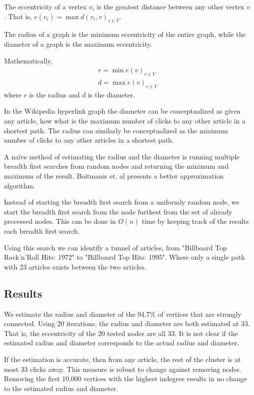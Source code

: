 \documentclass{article}
\begin{document}
The eccentricity of a vertex $v_i$ is the greatest distance between any other vertex $v$. That is, $e(v_i) = \max d(v_i, v)_{v \in V}$.

The radius of a graph is the minimum eccentricity of the entire graph, while the diameter of a graph is the maximum eccentricity.


Mathematically,
\begin{align*}
    r = \min e(v)_{v \in V} \\
    d = \max e(v)_{v \in V}
\end{align*}
where $r$ is the radius and $d$ is the diameter.

In the Wikipedia hyperlink graph the diameter can be conceptualized as given any article, how what is the maximum number of clicks to any other article in a shortest path. The radius can similarly be conceptualized as the minimum number of clicks to any other articles in a shortest path.


A naïve method of estimating the radius and the diameter is running multiple breadth first searches from random nodes and returning the minimum and maximum of the result. Boitmanis et. al presents a better approximation algorithm.

Instead of starting the breadth first search from a uniformly random node, we start the breadth first search from the node furthest from the set of already processed nodes. This can be done in $O(n)$ time by keeping track of the results each breadth first search.

Using this search we can identify a tunnel of articles, from "Billboard Top Rock'n'Roll Hits: 1972" to "Billboard Top Hits: 1995". Where only a single path with 23 articles exists between the two articles.


\subsection{Results}

We estimate the radius and diameter of the 94.7\% of vertices that are strongly connected.
Using 20 iterations, the radius and diameter are both estimated at 33. That is, the eccentricity of the 20 tested nodes are all 33.
It is not clear if the estimated radius and diameter corresponds to the actual radius and diameter.

If the estimation is accurate, then from any article, the rest of the cluster is at most 33 clicks away.
This measure is robust to change against removing nodes. Removing the first 10,000 vertices with the highest indegree results in no change to the estimated radius and diameter. 
\end{document}
